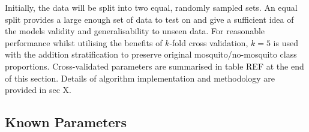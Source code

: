         Initially, the data will be split into two equal, randomly sampled sets. An equal split provides a large enough set of data to test on and give a sufficient idea of the models validity and generalisability to unseen data. For reasonable performance whilst utilising the benefits of $k$-fold cross validation, $k=5$ is used with the addition stratification to preserve original mosquito/no-mosquito class proportions. Cross-validated parameters are summarised in table REF at the end of this section. Details of algorithm implementation and methodology are provided in sec X.
        
        
    
        
     
         
  
    
        
    \subsection{Known Parameters}
    \label{subsec:exp-clf-known}  
